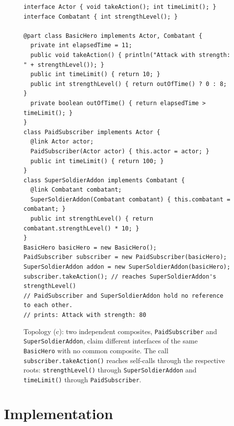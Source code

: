 \documentclass[acmsmall,screen,review,anonymous]{acmart}
\theoremstyle{acmplain}
\newcommand{\code}[1]{\texttt{#1}}
\begin{document}
\begin{figure}[H]
\begin{lstlisting}
interface Actor { void takeAction(); int timeLimit(); }
interface Combatant { int strengthLevel(); }

@part class BasicHero implements Actor, Combatant {
  private int elapsedTime = 11;
  public void takeAction() { println("Attack with strength: " + strengthLevel()); }
  public int timeLimit() { return 10; }
  public int strengthLevel() { return outOfTime() ? 0 : 8; }
  private boolean outOfTime() { return elapsedTime > timeLimit(); }
}
class PaidSubscriber implements Actor {
  @link Actor actor;
  PaidSubscriber(Actor actor) { this.actor = actor; }
  public int timeLimit() { return 100; }
}
class SuperSoldierAddon implements Combatant {
  @link Combatant combatant;
  SuperSoldierAddon(Combatant combatant) { this.combatant = combatant; }
  public int strengthLevel() { return combatant.strengthLevel() * 10; }
}
BasicHero basicHero = new BasicHero();
PaidSubscriber subscriber = new PaidSubscriber(basicHero);
SuperSoldierAddon addon = new SuperSoldierAddon(basicHero);
subscriber.takeAction(); // reaches SuperSoldierAddon's strengthLevel()
// PaidSubscriber and SuperSoldierAddon hold no reference to each other.
// prints: Attack with strength: 80
\end{lstlisting}
\caption{Topology (c): two independent composites, \code{PaidSubscriber} and
\code{SuperSoldierAddon}, claim different interfaces of the same \code{BasicHero} with no
common composite. The call \code{subscriber.takeAction()} reaches self-calls
through the respective roots: \code{strengthLevel()} through
\code{SuperSoldierAddon} and \code{timeLimit()} through \code{PaidSubscriber}.}
\label{fig:topology-c-listing}
\end{figure}

\section{Implementation}
\label{sec:impl}
\end{document}

